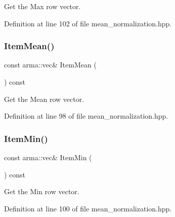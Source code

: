 Get the Max row vector. 



Definition at line 102 of file mean\+\_\+normalization.\+hpp.

\mbox{\label{classmlpack_1_1data_1_1MeanNormalization_a95996a797e721bc9acc0c9a5d697fdcf}} 
\subsubsection{Item\+Mean()}
{\footnotesize\ttfamily const arma\+::vec\& Item\+Mean (\begin{DoxyParamCaption}{ }\end{DoxyParamCaption}) const\hspace{0.3cm}{\ttfamily [inline]}}



Get the Mean row vector. 



Definition at line 98 of file mean\+\_\+normalization.\+hpp.

\mbox{\label{classmlpack_1_1data_1_1MeanNormalization_ae9ae591f227874f238c38d4cf070c6c8}} 
\subsubsection{Item\+Min()}
{\footnotesize\ttfamily const arma\+::vec\& Item\+Min (\begin{DoxyParamCaption}{ }\end{DoxyParamCaption}) const\hspace{0.3cm}{\ttfamily [inline]}}



Get the Min row vector. 



Definition at line 100 of file mean\+\_\+normalization.\+hpp.

\mbox{\label{classmlpack_1_1data_1_1MeanNormalization_a5adcafebd2c229793e57b7268c90a0fe}} 
